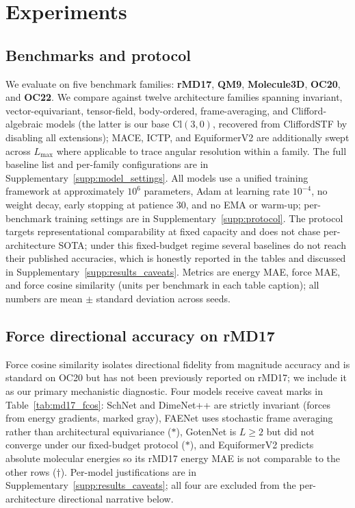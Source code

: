 \section{Experiments}\label{sec:experiments}

\subsection{Benchmarks and protocol}\label{sec:benchmarks}\label{sec:protocol}

We evaluate on five benchmark families: \textbf{rMD17}, \textbf{QM9}, \textbf{Molecule3D}, \textbf{OC20}, and \textbf{OC22}. We compare against twelve architecture families spanning invariant, vector-equivariant, tensor-field, body-ordered, frame-averaging, and Clifford-algebraic models (the latter is our base $\mathrm{Cl}(3,0)$, recovered from CliffordSTF by disabling all extensions); MACE, ICTP, and EquiformerV2 are additionally swept across $L_{\max}$ where applicable to trace angular resolution within a family. The full baseline list and per-family configurations are in Supplementary~\ref{supp:model_settings}. All models use a unified training framework at approximately $10^6$ parameters, Adam at learning rate $10^{-4}$, no weight decay, early stopping at patience 30, and no EMA or warm-up; per-benchmark training settings are in Supplementary~\ref{supp:protocol}. The protocol targets representational comparability at fixed capacity and does not chase per-architecture SOTA; under this fixed-budget regime several baselines do not reach their published accuracies, which is honestly reported in the tables and discussed in Supplementary~\ref{supp:results_caveats}. Metrics are energy MAE, force MAE, and force cosine similarity (units per benchmark in each table caption); all numbers are mean $\pm$ standard deviation across seeds.

\subsection{Force directional accuracy on rMD17}\label{sec:results_md17}

Force cosine similarity isolates directional fidelity from magnitude accuracy and is standard on OC20 but has not been previously reported on rMD17; we include it as our primary mechanistic diagnostic. Four models receive caveat marks in Table~\ref{tab:md17_fcos}: SchNet and DimeNet++ are strictly invariant (forces from energy gradients, marked gray), FAENet uses stochastic frame averaging rather than architectural equivariance ($\ast$), GotenNet is $L\!\geq\!2$ but did not converge under our fixed-budget protocol ($\ast$), and EquiformerV2 predicts absolute molecular energies so its rMD17 energy MAE is not comparable to the other rows ($\dagger$). Per-model justifications are in Supplementary~\ref{supp:results_caveats}; all four are excluded from the per-architecture directional narrative below.

